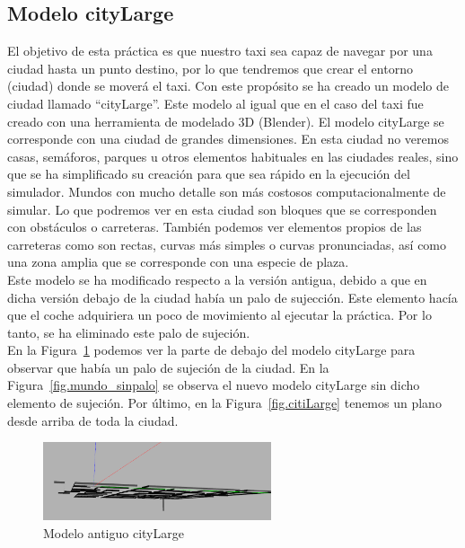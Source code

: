 \subsection{Modelo cityLarge}
El objetivo de esta práctica es que nuestro taxi sea capaz de navegar por una ciudad hasta un punto destino, por lo que tendremos que crear el entorno (ciudad) donde se moverá el taxi. Con este propósito se ha creado un modelo de ciudad llamado “cityLarge”. Este modelo al igual que en el caso del taxi fue creado con una herramienta de modelado 3D (Blender). El modelo cityLarge se corresponde con una ciudad de grandes dimensiones. En esta ciudad no veremos casas, semáforos, parques u otros elementos habituales en las ciudades reales, sino que se ha simplificado su creación para que sea rápido en la ejecución del simulador. Mundos con mucho detalle son más costosos computacionalmente de simular. Lo que podremos ver en esta ciudad son bloques que se corresponden con obstáculos o carreteras. También podemos ver elementos propios de las carreteras como son rectas, curvas más simples o curvas pronunciadas, así como una zona amplia que se corresponde con una especie de plaza.  \\

Este modelo se ha modificado respecto a la versión antigua, debido a que en dicha versión debajo de la ciudad había un palo de sujección. Este elemento hacía que el coche adquiriera un poco de movimiento al ejecutar la práctica. Por lo tanto, se ha eliminado este palo de sujeción. \\

En la Figura~\ref{fig.mundo_palo} podemos ver la parte de debajo del modelo cityLarge para observar que había un palo de sujeción de la ciudad. En la Figura~\ref{fig.mundo_sinpalo} se observa el nuevo modelo cityLarge sin dicho elemento de sujeción. Por último, en la Figura~\ref{fig.citiLarge} tenemos un plano desde arriba de toda la ciudad.

\begin{figure}[H]
  \begin{center}
    \includegraphics[width=0.6\textwidth]{figures/GPP/Mundo_palo.png}
		\caption{Modelo antiguo cityLarge}
		\label{fig.mundo_palo}
		\end{center}
\end{figure}

